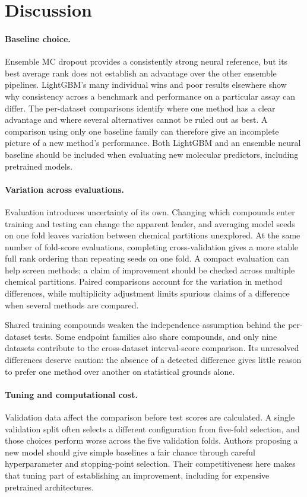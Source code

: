 \section{Discussion}
\label{sec:discussion}

\paragraph{Baseline choice.}
Ensemble MC dropout provides a consistently strong neural reference, but its best average rank does
not establish an advantage over the other ensemble pipelines. LightGBM's many individual wins and
poor results elsewhere show why consistency across a benchmark and performance on a particular
assay can differ. The per-dataset comparisons identify where one method has a clear advantage and
where several alternatives cannot be ruled out as best. A comparison using only one baseline family
can therefore give an incomplete picture of a new method's performance. Both LightGBM and an
ensemble neural baseline should be included when evaluating new molecular predictors, including
pretrained models.

\paragraph{Variation across evaluations.}
Evaluation introduces uncertainty of its own. Changing which compounds enter training and testing
can change the apparent leader, and averaging model seeds on one fold leaves variation between
chemical partitions unexplored. At the same number of fold-score evaluations, completing
cross-validation gives a more stable full rank ordering than repeating seeds on one fold. A compact
evaluation can help screen methods; a claim of improvement should be checked across multiple
chemical partitions. Paired comparisons account for the variation in method differences, while
multiplicity adjustment limits spurious claims of a difference when several methods are compared.

Shared training compounds weaken the independence assumption behind the per-dataset tests. Some
endpoint families also share compounds, and only nine datasets contribute to the cross-dataset
interval-score comparison. Its unresolved differences deserve caution: the absence of a detected
difference gives little reason to prefer one method over another on statistical grounds alone.

\paragraph{Tuning and computational cost.}
Validation data affect the comparison before test scores are calculated. A single validation split
often selects a different configuration from five-fold selection, and those choices perform worse
across the five validation folds. Authors proposing a new model should give simple baselines a fair
chance through careful hyperparameter and stopping-point selection. Their competitiveness here makes
that tuning part of establishing an improvement, including for expensive pretrained architectures.

